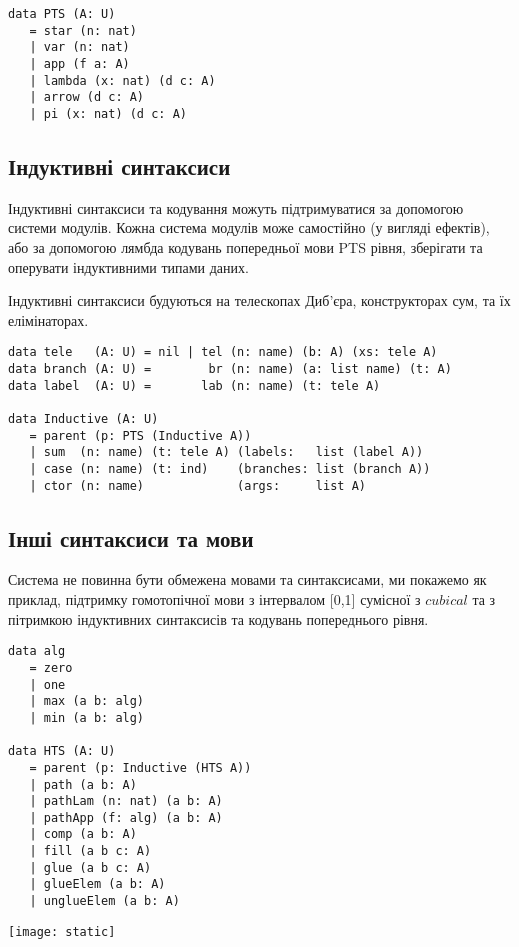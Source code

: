 \begin{lstlisting}[mathescape=true]
data PTS (A: U)
   = star (n: nat)
   | var (n: nat)
   | app (f a: A)
   | lambda (x: nat) (d c: A)
   | arrow (d c: A)
   | pi (x: nat) (d c: A)
\end{lstlisting}

\subsection{Індуктивні синтаксиси}
Індуктивні синтаксиси та кодування можуть підтримуватися за допомогою системи модулів.
Кожна система модулів може самостійно (у вигляді ефектів), або за допомогою лямбда кодувань
попередньої мови PTS рівня, зберігати та оперувати індуктивними типами даних.

Індуктивні синтаксиси будуються на телескопах Диб'єра,
конструкторах сум, та їх елімінаторах.

\begin{lstlisting}[mathescape=true]
data tele   (A: U) = nil | tel (n: name) (b: A) (xs: tele A)
data branch (A: U) =        br (n: name) (a: list name) (t: A)
data label  (A: U) =       lab (n: name) (t: tele A)

data Inductive (A: U)
   = parent (p: PTS (Inductive A))
   | sum  (n: name) (t: tele A) (labels:   list (label A))
   | case (n: name) (t: ind)    (branches: list (branch A))
   | ctor (n: name)             (args:     list A)
\end{lstlisting}

\subsection{Інші синтаксиси та мови}
Система не повинна бути обмежена мовами та синтаксисами, ми покажемо як приклад,
підтримку гомотопічної мови з інтервалом [0,1] сумісної з $cubical$ та з пітримкою індуктивних
синтаксисів та кодувань попереднього рівня.

\begin{lstlisting}[mathescape=true]
data alg
   = zero
   | one
   | max (a b: alg)
   | min (a b: alg)

data HTS (A: U)
   = parent (p: Inductive (HTS A))
   | path (a b: A)
   | pathLam (n: nat) (a b: A)
   | pathApp (f: alg) (a b: A)
   | comp (a b: A)
   | fill (a b c: A)
   | glue (a b c: A)
   | glueElem (a b: A)
   | unglueElem (a b: A)
\end{lstlisting}

\texttt{[image: static]}


